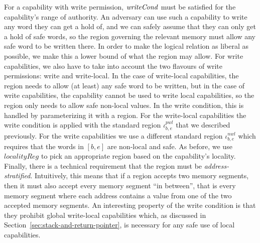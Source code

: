 \documentclass[format=acmsmall, review=false, screen=true]{acmart}
\renewcommand{\sectionname}{Section}
\newcommand{\var}[1]{\mathit{#1}}
\newcommand{\start}{\var{b}}
\newcommand{\addrend}{\var{e}}
\newcommand{\nwl}{\var{nwl}}
\newcommand{\pwl}{\var{pwl}}
\newcommand{\plainfun}[2]{
  \ifthenelse{\equal{#2}{}}
  {\mathit{#1}}
  {\mathit{#1}(#2)}
}
\newcommand{\writeCond}[1]{\plainfun{writeCond}{#1}}
\begin{document}
For a capability with write permission, $\writeCond{}$ must be satisfied for the
capability's range of authority. An adversary can use such a capability to write
any word they can get a hold of, and we can safely assume that they can only get
a hold of safe words, so the region governing the relevant memory must allow any
safe word to be written there. In order to make the logical relation as liberal
as possible, we make this a lower bound of what the region may allow. 
For write capabilities, we also have to take into account
the two flavours of write permissions: write and write-local. In the case of
write-local capabilities, the region needs to allow (at least) any safe word to
be written, but in the case of write capabilities, the capability cannot be used
to write local capabilities, so the region only needs to allow safe non-local
values. In the write condition, this is handled by parameterizing it with a
region. For the write-local capabilities the write condition is applied with the
standard region $\iota^\pwl_{\start,\addrend}$ that we described previously. For
the write capabilities we use a different standard region
$\iota^\nwl_{\start,\addrend}$ which requires that the words in
$[\start,\addrend]$ are non-local and safe. As before, we use
$\var{localityReg}$ to pick an appropriate region based on the capability's
locality. Finally, there is a technical requirement that the region must be
\emph{address-stratified}. Intuitively, this means that if a region accepts two
memory segments, then it must also accept every memory segment ``in between'',
that is every memory segment where each address contains a value from one of the
two accepted memory segments. An interesting property of the write condition is
that they prohibit global write-local capabilities which, as discussed in
\sectionname~\ref{sec:stack-and-return-pointer}, is necessary for any safe use of
local capabilities.
\end{document}
